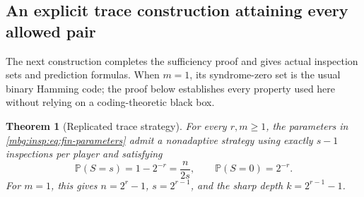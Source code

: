 \documentclass[11pt,letterpaper]{article}
\newtheorem{theorem}{Theorem}[section]
\theoremstyle{definition}
\newcommand{\Prb}{\mathbb P}
\begin{document}
\subsection{An explicit trace construction attaining every allowed pair}

The next construction completes the sufficiency proof and gives actual
inspection sets and prediction formulas.  When $m=1$, its syndrome-zero
set is the usual binary Hamming code; the proof below establishes every
property used here without relying on a coding-theoretic black box.

\begin{theorem}[Replicated trace strategy]\label{mbg:insp:thm:fin-trace}
For every $r,m\geq1$, the parameters in
\eqref{mbg:insp:eq:fin-parameters} admit a nonadaptive strategy using exactly
$s-1$ inspections per player and satisfying
\[
 \Prb(S=s)=1-2^{-r}=\frac{n}{2s},\qquad
 \Prb(S=0)=2^{-r}.
\]
For $m=1$, this gives $n=2^r-1$, $s=2^{r-1}$, and the sharp depth
$k=2^{r-1}-1$.
\end{theorem}
\end{document}
